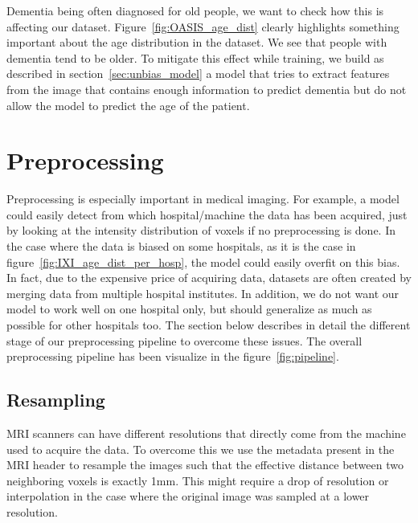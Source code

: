 Dementia being often diagnosed for old people, we want to check how this is affecting our dataset. Figure~\ref{fig:OASIS_age_dist} clearly highlights something important about the age distribution in the dataset. We see that people with dementia tend to be older. To mitigate this effect while training, we build as described in section~\ref{sec:unbias_model} a model that tries to extract features from the image that contains enough information to predict dementia but do not allow the model to predict the age of the patient. 


\section{Preprocessing}
Preprocessing is especially important in medical imaging. For example, a model could easily detect from which hospital/machine the data has been acquired, just by looking at the intensity distribution of voxels if no preprocessing is done. In the case where the data is biased on some hospitals, as it is the case in figure~\ref{fig:IXI_age_dist_per_hosp}, the model could easily overfit on this bias. In fact, due to the expensive price of acquiring data, datasets are often created by merging data from multiple hospital institutes. In addition, we do not want our model to work well on one hospital only, but should generalize as much as possible for other hospitals too. The section below describes in detail the different stage of our preprocessing pipeline to overcome these issues. The overall preprocessing pipeline has been visualize in the figure~\ref{fig:pipeline}.


\subsection{Resampling}
MRI scanners can have different resolutions that directly come from the machine used to acquire the data. To overcome this we use the metadata present in the MRI header to resample the images such that the effective distance between two neighboring voxels is exactly 1mm. This might require a drop of resolution or interpolation in the case where the original image was sampled at a lower resolution.


